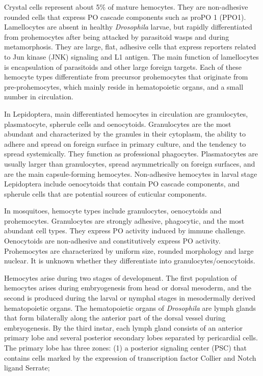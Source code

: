 \documentclass[11pt]{article}
\begin{document}
\begin{sloppypar}
Crystal cells represent about 5\% of mature hemocytes. 
They are non-adhesive rounded cells that express PO cascade components such as proPO 1 (PPO1). 
Lamellocytes are absent in healthy \textit{Drosophila} larvae, but rapidly differentiated from prohemocytes after being attacked by parasitoid wasps and during metamorphosis. 
They are large, flat, adhesive cells that express reporters related to Jun kinase (JNK) signaling and L1 antigen. 
The main function of lamellocytes is encapsulation of parasitoids and other large foreign targets. 
Each of these hemocyte types differentiate from precursor prohemocytes that originate from pre-prohemocytes, which mainly reside in hematopoietic organs, and a small number in circulation. 
\par
In Lepidoptera, main differentiated hemocytes in circulation are granulocytes, plasmatocyte, spherule cells and oenocytoids. 
Granulocytes are the most abundant and characterized by the granules in their cytoplasm, the ability to adhere and spread on foreign surface in primary culture, and the tendency to spread systemically. 
They function as professional phagocytes. 
Plasmatocytes are usually larger than granulocytes, spread asymmetrically on foreign surfaces, and are the main capsule-forming hemocytes. 
Non-adhesive hemocytes in larval stage Lepidoptera include oenocytoids that contain PO cascade components, and spherule cells that are potential sources of cuticular components. 
\par
In mosquitoes, hemocyte types include granulocytes, oenocytoids and prohemocytes. 
Granulocytes are strongly adhesive, phagocytic, and the most abundant cell types. 
They express PO activity induced by immune challenge. 
Oenocytoids are non-adhesive and constitutively express PO activity. 
Prohemocytes are characterized by uniform size, rounded morphology and large nuclear. 
It is unknown whether they differentiate into granulocytes/oenocytoids.
\par
Hemocytes arise during two stages of development. 
The first population of hemocytes arises during embryogenesis from head or dorsal mesoderm, and the second is produced during the larval or nymphal stages in mesodermally derived hematopoietic organs. 
The hematopoietic organs of \textit{Drosophila} are lymph glands that form bilaterally along the anterior part of the dorsal vessel during embryogenesis. 
By the third instar, each lymph gland consists of an anterior primary lobe and several posterior secondary lobes separated by pericardial cells. 
The primary lobe has three zones: 
(1) a posterior signaling center (PSC) that contains cells marked by the expression of transcription factor Collier and Notch ligand Serrate; 

\end{sloppypar}
\end{document}
